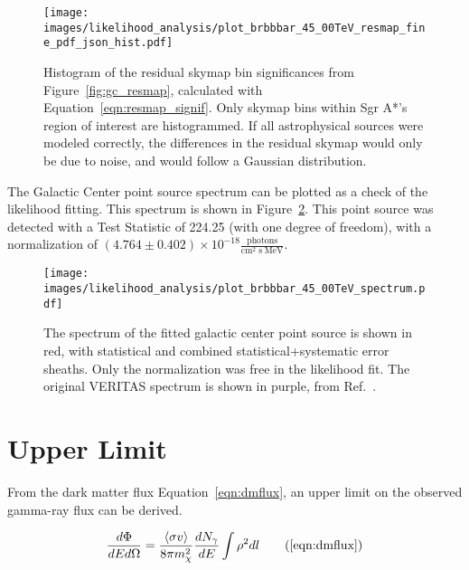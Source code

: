   \begin{figure}[ht]
    \centering
    \texttt{[image: images/likelihood\_analysis/plot\_brbbbar\_45\_00TeV\_resmap\_fine\_pdf\_json\_hist.pdf]}
    \caption[Galactic Center Residual Histogram]
    {
      Histogram of the residual skymap bin significances from Figure~\ref{fig:gc_resmap}, calculated with Equation~\ref{eqn:resmap_signif}.
      Only skymap bins within Sgr A*'s region of interest are histogrammed.
      If all astrophysical sources were modeled correctly, the differences in the residual skymap would only be due to noise, and would follow a Gaussian distribution.
    }
    \label{fig:gc_resmap_sighist}
  \end{figure}


  The Galactic Center point source spectrum can be plotted as a check of the likelihood fitting.
  This spectrum is shown in Figure~\ref{fig:gc_pntsrc_spectrum}.
  This point source was detected with a Test Statistic of 224.25 (with one degree of freedom), with a normalization of $(4.764\pm0.402)\times 10^{-18} \frac{\textrm{photons}}{\textrm{cm}^2\;\textrm{s}\;\textrm{MeV}}$.
  

  \begin{figure}[ht]
    \centering
    \texttt{[image: images/likelihood\_analysis/plot\_brbbbar\_45\_00TeV\_spectrum.pdf]}
    \caption[Galactic Center Point Source Spectrum]
    {
      The spectrum of the fitted galactic center point source is shown in red, with statistical and combined statistical+systematic error sheaths.
      Only the normalization was free in the likelihood fit.
      The original VERITAS spectrum is shown in purple, from Ref.~\cite{VeritasGCRidge2015}.
    }
    \label{fig:gc_pntsrc_spectrum}
  \end{figure}
  
  
\section{Upper Limit}\label{upper_limit}
  From the dark matter flux Equation~\ref{eqn:dmflux}, an upper limit on the observed gamma-ray flux can be derived.

  \begin{equation}
    \frac{ d\Phi }{ dE d \Omega } = \frac{ \left \langle \sigma v \right \rangle }{8 \pi m_\chi^2} \frac{dN_{\gamma}}{dE} \int \rho^2 dl\tag{\ref{eqn:dmflux}}
  \end{equation}

